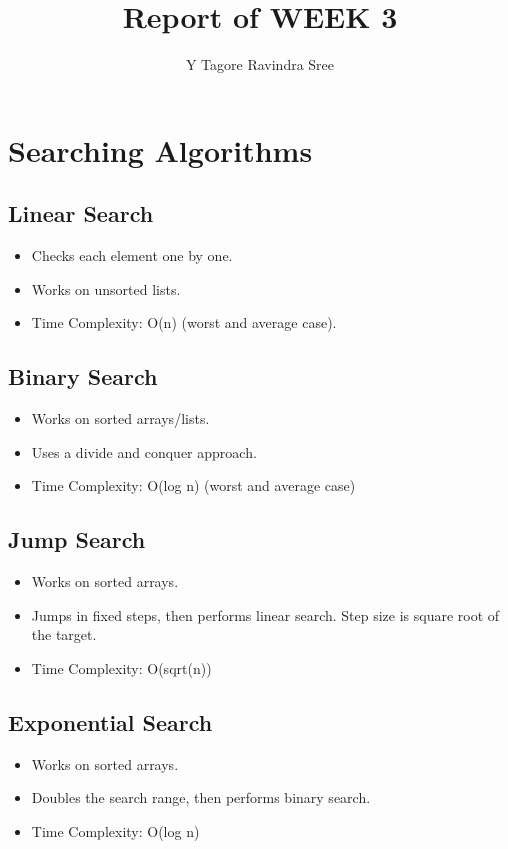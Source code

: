 \documentclass[12pt, letterpaper]{article}
\title{Report of WEEK 3}
\author{
    Y Tagore Ravindra Sree 
}
\date{} %
\begin{document}
\maketitle
\section{Searching Algorithms}
\subsection{Linear Search}
\begin{itemize}
    \item Checks each element one by one.
    \item Works on unsorted lists.
    \item Time Complexity: O(n) (worst and average case).
\end{itemize}
\subsection{Binary Search}
\begin{itemize}
    \item Works on sorted arrays/lists.
    \item Uses a divide and conquer approach.
    \item Time Complexity: O(log n) (worst and average case)
\end{itemize}
\subsection{Jump Search}
\begin{itemize}
    \item Works on sorted arrays.
    \item Jumps in fixed steps, then performs linear search. Step size is square root of the target.
    \item Time Complexity: O(sqrt(n))
\end{itemize}
\subsection{Exponential Search}
\begin{itemize}
    \item Works on sorted arrays.
    \item Doubles the search range, then performs binary search.
    \item Time Complexity: O(log n)
\end{itemize}
\end{document}
